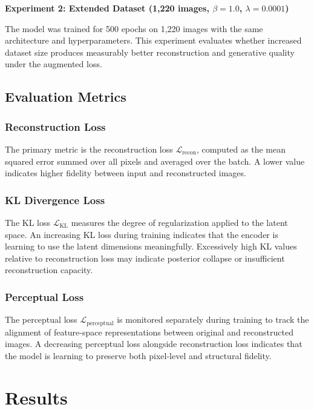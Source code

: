 \documentclass[11pt,a4paper]{article}
\begin{document}
\textbf{Experiment 2: Extended Dataset (1{,}220 images, $\beta = 1.0$, $\lambda = 0.0001$)}

The model was trained for 500 epochs on 1{,}220 images with the same architecture and hyperparameters. This experiment evaluates whether increased dataset size produces measurably better reconstruction and generative quality under the augmented loss.


\subsection{Evaluation Metrics}
\subsubsection{Reconstruction Loss}

The primary metric is the reconstruction loss $\mathcal{L}_{\mathrm{recon}}$, computed as the mean squared error summed over all pixels and averaged over the batch. A lower value indicates higher fidelity between input and reconstructed images.

\subsubsection{KL Divergence Loss}

The KL loss $\mathcal{L}_{\mathrm{KL}}$ measures the degree of regularization applied to the latent space. An increasing KL loss during training indicates that the encoder is learning to use the latent dimensions meaningfully. Excessively high KL values relative to reconstruction loss may indicate posterior collapse or insufficient reconstruction capacity.

\subsubsection{Perceptual Loss}

The perceptual loss $\mathcal{L}_{\mathrm{perceptual}}$ is monitored separately during training to track the alignment of feature-space representations between original and reconstructed images. A decreasing perceptual loss alongside reconstruction loss indicates that the model is learning to preserve both pixel-level and structural fidelity.

\section{Results}
\end{document}
